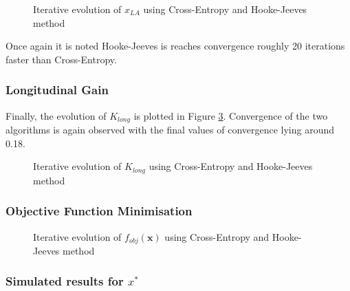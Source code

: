 \documentclass[conf]{new-aiaa}
\begin{document}
\begin{figure}[H]
    \begin{center}
        \vspace{-2.5mm}
        \resizebox{0.6\textwidth}{!}{}
        \vspace{-7.5mm}
    \end{center}
    \caption{Iterative evolution of $x_{LA}$ using Cross-Entropy and Hooke-Jeeves method}
    \label{fig:x_la_evo}
\end{figure}

Once again it is noted Hooke-Jeeves is reaches convergence roughly 20 iterations faster than Cross-Entropy.

\subsubsection{Longitudinal Gain}

Finally, the evolution of $K_{long}$ is plotted in Figure \ref{fig:k_long_evo}. Convergence of the two algorithms is again observed with the final values of convergence lying around 0.18. 

\begin{figure}[H]
    \begin{center}
        \vspace{-2.5mm}
        \resizebox{0.6\textwidth}{!}{}
        \vspace{-7.5mm}
    \end{center}
    \caption{Iterative evolution of $K_{long}$ using Cross-Entropy and Hooke-Jeeves method}
    \label{fig:k_long_evo}
\end{figure}

\subsubsection{Objective Function Minimisation}

\begin{figure}[H]
    \begin{center}
        \vspace{-2.5mm}
        \resizebox{0.6\textwidth}{!}{}
        \vspace{-7.5mm}
    \end{center}
    \caption{Iterative evolution of $f_{obj}(\textbf{x})$ using Cross-Entropy and Hooke-Jeeves method}
    \label{fig:k_long_evo}
\end{figure}

\subsubsection{Simulated results for $x^*$}
\end{document}
